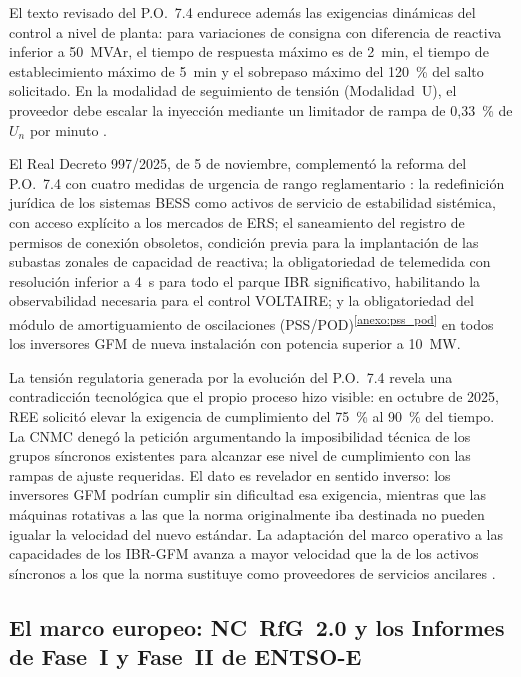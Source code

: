 El texto revisado del P.O.~7.4 endurece además las exigencias dinámicas
del control a nivel de planta: para variaciones de consigna con
diferencia de reactiva inferior a 50~MVAr, el tiempo de respuesta máximo
es de 2~min, el tiempo de establecimiento máximo de 5~min y el sobrepaso
máximo del 120~\% del salto solicitado. En la modalidad de seguimiento
de tensión (Modalidad~U), el proveedor debe escalar la inyección mediante
un limitador de rampa de 0{,}33~\% de $U_n$ por minuto \cite{boe2025}.

El Real Decreto 997/2025, de 5 de noviembre, complementó la reforma del
P.O.~7.4 con cuatro medidas de urgencia de rango reglamentario
\cite{rd997_2025}: la redefinición jurídica de los sistemas BESS como
activos de servicio de estabilidad sistémica, con acceso explícito a los
mercados de ERS; el saneamiento del registro de permisos de conexión
obsoletos, condición previa para la implantación de las subastas zonales
de capacidad de reactiva; la obligatoriedad de telemedida con resolución
inferior a 4~s para todo el parque IBR significativo, habilitando la
observabilidad necesaria para el control VOLTAIRE; y la obligatoriedad
del módulo de amortiguamiento de oscilaciones
(PSS/POD)\textsuperscript{\ref{anexo:pss_pod}} en todos los inversores
GFM de nueva instalación con potencia superior a 10~MW.

La tensión regulatoria generada por la evolución del P.O.~7.4 revela una
contradicción tecnológica que el propio proceso hizo visible: en octubre
de 2025, REE solicitó elevar la exigencia de cumplimiento del 75~\% al
90~\% del tiempo. La CNMC denegó la petición argumentando la
imposibilidad técnica de los grupos síncronos existentes para alcanzar
ese nivel de cumplimiento con las rampas de ajuste requeridas. El dato es
revelador en sentido inverso: los inversores GFM podrían cumplir sin
dificultad esa exigencia, mientras que las máquinas rotativas a las que
la norma originalmente iba destinada no pueden igualar la velocidad del
nuevo estándar. La adaptación del marco operativo a las capacidades de
los IBR-GFM avanza a mayor velocidad que la de los activos síncronos a
los que la norma sustituye como proveedores de servicios ancilares
\cite{boe2025}.

\subsection{El marco europeo: NC~RfG~2.0 y los Informes de Fase~I y
Fase~II de ENTSO-E}
\label{subsec:nc_rfg_20}

